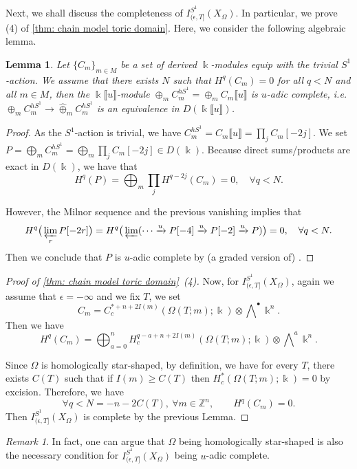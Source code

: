 \documentclass[11pt]{amsart}
\numberwithin{equation}{section}
\theoremstyle{plain}
\newtheorem{Lemma}[lemma]{Lemma}
\theoremstyle{definition}
\theoremstyle{remark}
\newtheorem{RMK}[rmk]{Remark}
\newcommand{\bZ} { {\mathbb{Z}}}
\newcommand{\fpw}[1]{{\llbracket #1\rrbracket}}
\begin{document}
Next, we shall discuss the completeness of $I_{(\epsilon,T]}^{S^1}(X_\Omega)$. In particular, we prove (4) of \autoref{thm: chain model toric domain}.
Here, we consider the following algebraic lemma.
\begin{Lemma}\label{lemma: sufficient condition for completeness}Let $\{C_m\}_{m\in M}$ be a set of derived $\Bbbk$-modules equip with the trivial $S^1$-action. We assume that there exists $N$ such that $H^q(C_m)=0$ for all $q<N$ and all $m\in M$, then the $\Bbbk\fpw{u}$-module $\oplus_m C_m^{hS^1}=\oplus_m C_m\fpw{u}$ is $u$-adic complete, i.e. $\oplus_m C_m^{hS^1} \to \widehat\oplus_m C_m^{hS^1}$ is an equivalence in $D(\Bbbk\fpw{u})$.
\end{Lemma}
\begin{proof}As the $S^1$-action is trivial, we have $C_m^{hS^1}=C_m\fpw{u}=\prod_j C_m[-2j]$.
We set $P=\bigoplus_m C_m^{hS^1}=\bigoplus_m\prod_j C_m[-2j] \in D(\Bbbk)$. Because direct sums/products are exact in $D(\Bbbk)$, we have that 
\[H^q(P)=\bigoplus_m\prod_j H^{q-2j}(C_m)=0,\quad \forall q<N.\]

However, the Milnor sequence \cite[Tag 0CQE]{StacksProject} and the previous vanishing implies that
\[H^q\big(\varprojlim_r P[-2r]\big)=H^q\big(\varprojlim (\cdots\xrightarrow{u} P[-4] \xrightarrow{u} P[-2]\xrightarrow{u} P )\big)=0,\quad \forall q<N.\]
Then we conclude that $P$ is $u$-adic complete by (a graded version of) \cite[Tag 091P-(3)]{StacksProject}.
\end{proof}

\begin{proof}[Proof of \autoref{thm: chain model toric domain}~(4)] 
Now, for $I_{(\epsilon,T]}^{S^1}(X_\Omega)$, again we assume that $\epsilon=-\infty$ and we fix $T$, we set
\[C_m=C^{*+n+2I(m)}_c({\Omega(T;m)} ;\Bbbk  )\otimes \bigwedge\nolimits^\bullet \Bbbk ^n.\]
Then we have 
\[H^q(C_m)=\bigoplus_{a=0}^nH^{q-a+n+2I(m)}_c({\Omega(T;m)} ;\Bbbk)\otimes \bigwedge\nolimits^a \Bbbk ^n.\]



Since $\Omega$ is homologically star-shaped, by definition, we have for every $T$, there exists $C(T)$ such that if $I(m) \geq C(T)$ then $H^{*}_c({\Omega(T;m)} ;\Bbbk)=0$ by excision. Therefore, we have
\[\forall q<N=-n-2C(T), ~\forall m\in \bZ^n,\qquad H^q(C_m)=0.\]
Then $I_{(\epsilon,T]}^{S^1}(X_\Omega)$ is complete by the previous Lemma.
\end{proof}
\begin{RMK}In fact, one can argue that $\Omega$ being homologically star-shaped is also the necessary condition for $I_{(\epsilon,T]}^{S^1}(X_\Omega)$ being $u$-adic complete.
\end{RMK}
\end{document}
